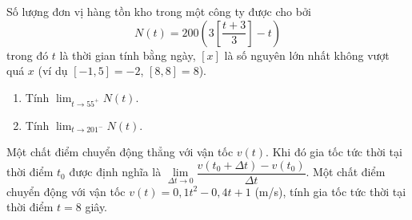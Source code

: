 \begin{vd}%
	Số lượng đơn vị hàng tồn kho trong một công ty  được cho bởi
	$$
	N(t)=200\left(3 \left [\frac{t+3}{3}  \right ]-t\right)
	$$
	trong đó $t$ là thời gian tính bằng ngày, $[x]$ là số nguyên lớn nhất không vượt quá $x$ (ví dụ $[-1{,}5]=-2$, $[8{,}8] = 8$).
	\begin{enumerate}
		\item Tính $\displaystyle \lim_{t \to 55^+} N(t)$.
		\item  Tính $\displaystyle \lim_{t \to 201^-} N(t)$.
	\end{enumerate}
\end{vd}


\begin{vd}%
	Một chất điểm chuyển động thẳng với vận tốc $v(t)$. Khi đó gia tốc tức thời tại thời điểm $t_0$ được định nghĩa là $\displaystyle \lim \limits_{\Delta t \to 0} \dfrac{v(t_0+ \Delta t) - v(t_0)}{\Delta t}$. Một chất điểm chuyển động với vận tốc $v(t) = 0{,}1t^2-0{,}4t+1$ (m/s), tính gia tốc tức thời tại thời điểm $t=8$ giây. 
\end{vd}

